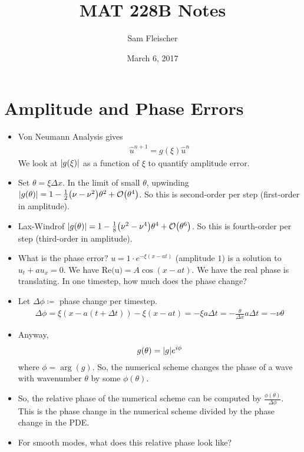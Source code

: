 \documentclass{article}
\title{MAT 228B Notes}
\author{Sam Fleischer}
\date{March 6, 2017}
\newcommand{\Dx}{\Delta x}
\newcommand{\Dt}{\Delta t}
\newcommand{\Dphi}{\Delta \phi}
\begin{document}
    \maketitle

    \section{Amplitude and Phase Errors}
        \begin{itemize}
            \item Von Neumann Analysis gives
            \begin{align*}
                \hat{u}^{n+1} = g(\xi)\hat{u}^n
            \end{align*}
            We look at $\abs{g(\xi)}$ as a function of $\xi$ to quantify amplitude error.
            \item Set $\theta = \xi\Dx$.  In the limit of small $\theta$, upwinding $\abs{g(\theta)} = 1 - \frac{1}{2}\qty(\nu - \nu^2)\theta^2 + \order{\theta^4}$.  So this is second-order per step (first-order in amplitude).
            \item Lax-Windrof $\abs{g(\theta)} = 1 - \frac{1}{8}\qty(\nu^2 - \nu^4)\theta^4 + \order{\theta^6}$.  So this is fourth-order per step (third-order in amplitude).
            \item What is the phase error? $u = 1\cdot e^{-\xi(x - at)}$ (amplitude $1$) is a solution to $u_t + au_x = 0$.  We have $\text{Re(u)} = A\cos(x - at)$.  We have the real phase is translating.  In one timestep, how much does the phase change?
            \item Let $\Dphi \coloneqq $ phase change per timestep.
            \begin{align*}
                \Dphi = \xi(x - a(t + \Dt)) - \xi(x - at) = -\xi a\Dt = -\frac{\theta}{\Dx}a\Dt = -\nu\theta
            \end{align*}
            \item Anyway,
            \begin{align*}
                g(\theta) = \abs{g}e^{i\phi}
            \end{align*}
            where $\phi = \arg(g)$.  So, the numerical scheme changes the phase of a wave with wavenumber $\theta$ by some $\phi(\theta)$.
            \item So, the relative phase of the numerical scheme can be computed by $\frac{\phi(\theta)}{\Dphi}$.  This is the phase change in the numerical scheme divided by the phase change in the PDE.
            \item For smooth modes, what does this relative phase look like?

\end{itemize}
\end{document}
